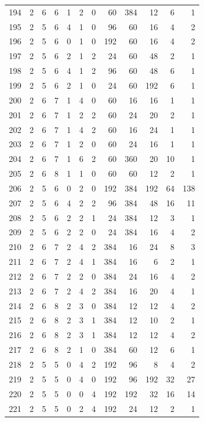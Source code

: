 \documentclass[11pt,a4paper]{article}
\begin{document}
\begin{longtable}{r|rrr|rrr|rrr|rr}
194 & 2 & 6 & 6 & 1 & 2 & 0 & 60 & 384 & 12 & 6 & 1\\
195 & 2 & 5 & 6 & 4 & 1 & 0 & 96 & 60 & 16 & 4 & 2\\
196 & 2 & 5 & 6 & 0 & 1 & 0 & 192 & 60 & 16 & 4 & 2\\
197 & 2 & 5 & 6 & 2 & 1 & 2 & 24 & 60 & 48 & 2 & 1\\
198 & 2 & 5 & 6 & 4 & 1 & 2 & 96 & 60 & 48 & 6 & 1\\
199 & 2 & 5 & 6 & 2 & 1 & 0 & 24 & 60 & 192 & 6 & 1\\
200 & 2 & 6 & 7 & 1 & 4 & 0 & 60 & 16 & 16 & 1 & 1\\
201 & 2 & 6 & 7 & 1 & 2 & 2 & 60 & 24 & 20 & 2 & 1\\
202 & 2 & 6 & 7 & 1 & 4 & 2 & 60 & 16 & 24 & 1 & 1\\
203 & 2 & 6 & 7 & 1 & 2 & 0 & 60 & 24 & 16 & 1 & 1\\
204 & 2 & 6 & 7 & 1 & 6 & 2 & 60 & 360 & 20 & 10 & 1\\
205 & 2 & 6 & 8 & 1 & 1 & 0 & 60 & 60 & 12 & 2 & 1\\
206 & 2 & 5 & 6 & 0 & 2 & 0 & 192 & 384 & 192 & 64 & 138\\
207 & 2 & 5 & 6 & 4 & 2 & 2 & 96 & 384 & 48 & 16 & 11\\
208 & 2 & 5 & 6 & 2 & 2 & 1 & 24 & 384 & 12 & 3 & 1\\
209 & 2 & 5 & 6 & 2 & 2 & 0 & 24 & 384 & 16 & 4 & 2\\
210 & 2 & 6 & 7 & 2 & 4 & 2 & 384 & 16 & 24 & 8 & 3\\
211 & 2 & 6 & 7 & 2 & 4 & 1 & 384 & 16 & 6 & 2 & 1\\
212 & 2 & 6 & 7 & 2 & 2 & 0 & 384 & 24 & 16 & 4 & 2\\
213 & 2 & 6 & 7 & 2 & 4 & 2 & 384 & 16 & 20 & 4 & 1\\
214 & 2 & 6 & 8 & 2 & 3 & 0 & 384 & 12 & 12 & 4 & 2\\
215 & 2 & 6 & 8 & 2 & 3 & 1 & 384 & 12 & 10 & 2 & 1\\
216 & 2 & 6 & 8 & 2 & 3 & 1 & 384 & 12 & 12 & 4 & 2\\
217 & 2 & 6 & 8 & 2 & 1 & 0 & 384 & 60 & 12 & 6 & 1\\
218 & 2 & 5 & 5 & 0 & 4 & 2 & 192 & 96 & 8 & 4 & 2\\
219 & 2 & 5 & 5 & 0 & 4 & 0 & 192 & 96 & 192 & 32 & 27\\
220 & 2 & 5 & 5 & 0 & 0 & 4 & 192 & 192 & 32 & 16 & 14\\
221 & 2 & 5 & 5 & 0 & 2 & 4 & 192 & 24 & 12 & 2 & 1\\

\end{longtable}
\end{document}

